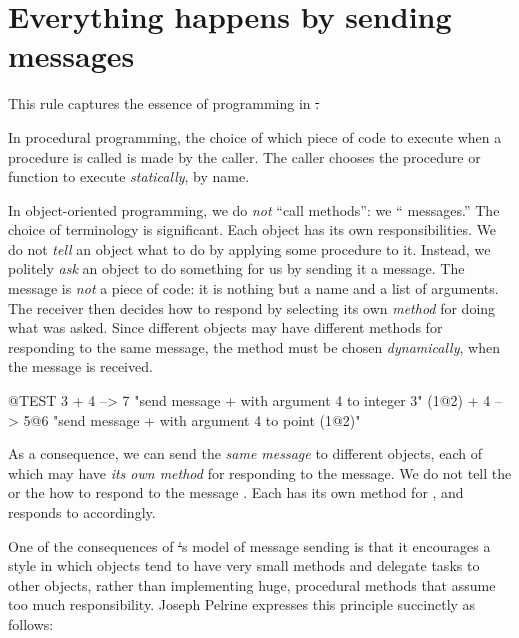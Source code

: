 \documentclass[a4paper,10pt,twoside]{book}
\begin{document}
\section{Everything happens by sending messages}


This rule captures the essence of programming in \st.

In procedural programming, the choice of which piece of code to execute when a procedure is called is made by the caller.
The caller chooses the procedure or function to execute \emph{statically}, by name.  

In object-oriented programming, we do \emph{not} ``call methods'': we `` messages.''
The choice of terminology is significant.
Each object has its own responsibilities.
We do not \emph{tell} an object what to do by applying some procedure to it.
Instead, we politely \emph{ask} an object to do something for us by sending it a message.
The message is \emph{not} a piece of code: it is nothing but a name and a list of arguments.
The receiver then decides how to respond by selecting its own \emph{method} for doing what was asked.
Since different objects may have different methods for responding to the same message, the method must be chosen \emph{dynamically}, when the message is received.
\begin{code}{@TEST}
3 + 4         --> 7          "send message + with argument 4 to integer  3"
(1@2) + 4 --> 5@6    "send message + with argument 4 to point (1@2)"
\end{code}
\noindent
As a consequence, we can send the \emph{same message} to different objects, each of which may have \emph{its own method} for responding to the message.
We do not tell the   or the   how to respond to the message .
Each has its own method for \ct{+}, and responds to  accordingly.

One of the consequences of \st's model of message sending is that it encourages a style in which objects tend to have very small methods and delegate tasks to other objects, rather than implementing huge, procedural methods that assume too much responsibility.
Joseph Pelrine
expresses this principle succinctly as follows:
\end{document}
